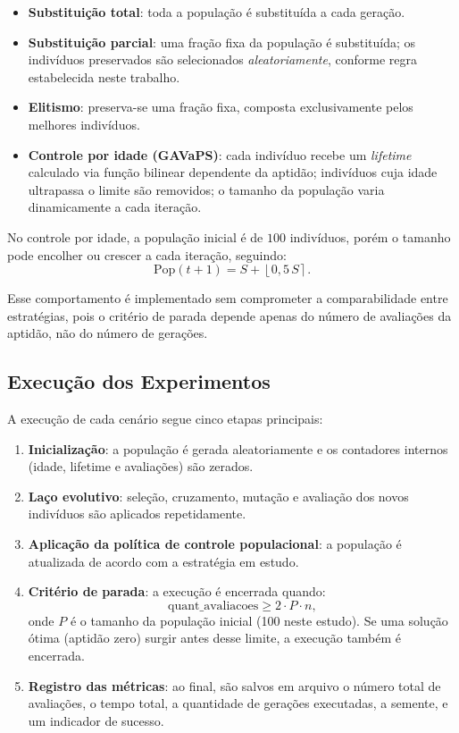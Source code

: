 \begin{itemize}
    \item \textbf{Substituição total}: toda a população é substituída a cada geração.
    
    \item \textbf{Substituição parcial}: uma fração fixa da população é substituída; os indivíduos preservados são selecionados \emph{aleatoriamente}, conforme regra estabelecida neste trabalho.

    \item \textbf{Elitismo}: preserva-se uma fração fixa, composta exclusivamente pelos melhores indivíduos.
    
    \item \textbf{Controle por idade (GAVaPS)}: cada indivíduo recebe um \textit{lifetime} calculado via função bilinear dependente da aptidão; indivíduos cuja idade ultrapassa o limite são removidos; o tamanho da população varia dinamicamente a cada iteração.
\end{itemize}

No controle por idade, a população inicial é de $100$ indivíduos, porém o tamanho pode encolher ou crescer a cada iteração, seguindo:
\[
\text{Pop}(t+1) = S + \left\lfloor 0{,}5\,S \right\rceil.
\]

Esse comportamento é implementado sem comprometer a comparabilidade entre estratégias, pois o critério de parada depende apenas do número de avaliações da aptidão, não do número de gerações.

\subsection{Execução dos Experimentos}

A execução de cada cenário segue cinco etapas principais:

\begin{enumerate}
    \item \textbf{Inicialização}: a população é gerada aleatoriamente e os contadores internos (idade, lifetime e avaliações) são zerados.

    \item \textbf{Laço evolutivo}: seleção, cruzamento, mutação e avaliação dos novos indivíduos são aplicados repetidamente.

    \item \textbf{Aplicação da política de controle populacional}: a população é atualizada de acordo com a estratégia em estudo.

    \item \textbf{Critério de parada}: a execução é encerrada quando:
    \[
    \text{quant\_avaliacoes} \geq 2 \cdot P \cdot n,
    \]
    onde $P$ é o tamanho da população inicial (100 neste estudo).  
    Se uma solução ótima (aptidão zero) surgir antes desse limite, a execução também é encerrada.

    \item \textbf{Registro das métricas}: ao final, são salvos em arquivo o número total de avaliações, o tempo total, a quantidade de gerações executadas, a semente, e um indicador de sucesso.
\end{enumerate}

